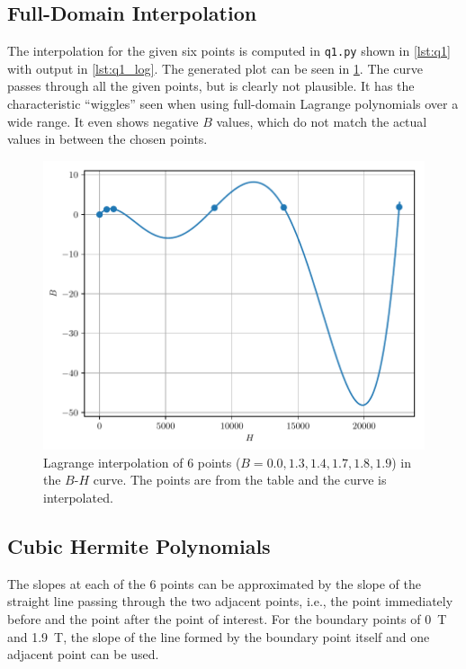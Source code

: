 \documentclass[a4paper,titlepage]{article}
\newcommand{\code}[1]{\texttt{#1}}
\begin{document}
	\subsection{Full-Domain Interpolation}	
	
	The interpolation for the given six points is computed in \code{q1.py} shown in \cref{lst:q1} with output in \cref{lst:q1_log}. The generated plot can be seen in \cref{fig:q1b}. The curve passes through all the given points, but is clearly not plausible. It has the characteristic ``wiggles'' seen when using full-domain Lagrange polynomials over a wide range. It even shows negative $B$ values, which do not match the actual values in between the chosen points.
	
	\begin{figure}[!htb]
		\centering
		\includegraphics[width=\columnwidth]{plots/q1b.pdf}
		\caption
		{Lagrange interpolation of 6 points ($B = 0.0, 1.3, 1.4, 1.7, 1.8, 1.9$) in the $B$-$H$ curve. The points are from the table and the curve is interpolated.}
		\label{fig:q1b}
	\end{figure}
	
	\subsection{Cubic Hermite Polynomials} \label{sec:cubic_hermite}
	The slopes at each of the 6 points can be approximated by the slope of the straight line passing through the two adjacent points, i.e., the point immediately before and the point after the point of interest. For the boundary points of \SI{0}{\tesla} and \SI{1.9}{\tesla}, the slope of the line formed by the boundary point itself and one adjacent point can be used.
	
\end{document}
